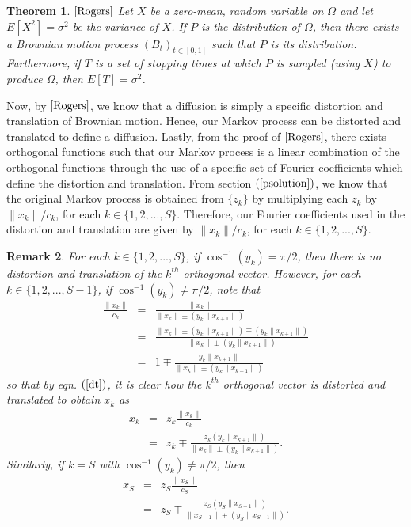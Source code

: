 \documentclass[11pt]{imsart}
\newtheorem{theorem}{Theorem}
\newtheorem{remark}[theorem]{Remark}
\begin{document}
\begin{theorem}
\label{embed}
$\cite[Theorem\ (7.5)\ Skorokhod\ Embedding]{Rogers}$
Let $X$ be a zero-mean, random variable on $\Omega$ and let $E[X^{2}]=\sigma^{2}$ be the variance of $X$.  If $P$ is the distribution of $\Omega$, then there exists a Brownian motion process $(B_{t})_{t \in [0,1]}$ such that $P$ is its distribution.  Furthermore, if $T$ is a set of stopping times at which $P$ is sampled (using $X$) to produce $\Omega$, then $E[T]=\sigma^{2}$.
\end{theorem}

Now, by $\cite[Theorem\ (5.11)]{Rogers}$, we know that a diffusion is simply a specific distortion and translation of Brownian motion.  Hence, our Markov process can be distorted and translated to define a diffusion.  Lastly, from the proof of $\cite[Theorem\ (6.1)\ Brownian\ Motion]{Rogers}$, there exists orthogonal functions such that our Markov process is a linear combination of the orthogonal functions through the use of a specific set of Fourier coefficients which define the distortion and translation.  From section $(\ref{psolution})$, we know that the original Markov process is obtained from $\{z_{k}\}$ by multiplying each $z_{k}$ by $\|x_{k}\|/c_{k}$, for each $k \in \{1,2,...,S\}$.  Therefore, our Fourier coefficients used in the distortion and translation are given by $\|x_{k}\|/c_{k}$, for each $k \in \{1,2,...,S\}$.

\begin{remark}
For each $k \in \{1,2,...,S\}$, if $\cos^{-1}(y_{k}) = \pi/2$, then there is no distortion and translation of the $k^{th}$ orthogonal vector.  However, for each $k \in \{1,2,...,S-1\}$, if $\cos^{-1}(y_{k}) \ne \pi/2$, note that
\begin{eqnarray}
\label{dt}
\frac{\|x_{k}\|}{c_{k}} &=& \frac{\|x_{k}\|}{\|x_{k}\| \pm (y_{k}\|x_{k+1}\|)} \nonumber \\ &=& \frac{\|x_{k}\| \pm (y_{k}\|x_{k+1}\|) \mp (y_{k}\|x_{k+1}\|)}{\|x_{k}\| \pm (y_{k}\|x_{k+1}\|)} \nonumber \\ &=& 1 \mp \frac{y_{k}\|x_{k+1}\|}{\|x_{k}\| \pm (y_{k}\|x_{k+1}\|)}
\end{eqnarray}
so that by eqn. $(\ref{dt})$, it is clear how the $k^{th}$ orthogonal vector is distorted and translated to obtain $x_{k}$ as
\begin{eqnarray}
\label{distk}
x_{k} &=& z_{k}\frac{\|x_{k}\|}{c_{k}} \nonumber \\ &=& z_{k} \mp \frac{z_{k}(y_{k}\|x_{k+1}\|)}{\|x_{k}\| \pm (y_{k}\|x_{k+1}\|)}.
\end{eqnarray}
Similarly, if $k = S$ with $\cos^{-1}(y_{k}) \ne \pi/2$, then
\begin{eqnarray}
\label{dists}
x_{S} &=& z_{S}\frac{\|x_{S}\|}{c_{S}} \nonumber \\ &=& z_{S} \mp \frac{z_{S}(y_{S}\|x_{S-1}\|)}{\|x_{S-1}\| \pm (y_{S}\|x_{S-1}\|)}.
\end{eqnarray}
\end{remark}
\end{document}
